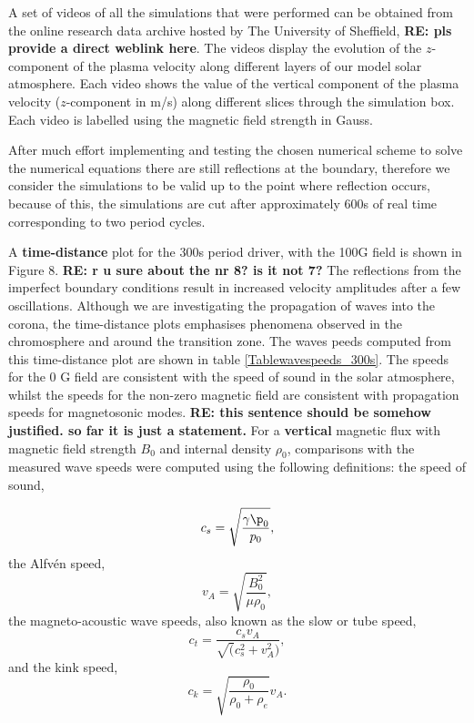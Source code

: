 \documentclass[physics,article,submit,pdftex,moreauthors]{Definitions/mdpi}
\begin{document}
A set of videos of all the simulations that were performed can be obtained from the online research data archive hosted by The University of Sheffield, \citet{Griffiths2018a} {\bf RE: pls provide a direct weblink here}. The videos display the evolution of the $z$-component of the plasma velocity along different layers of our model solar atmosphere. Each video shows the value of the vertical component of the plasma velocity ($z$-component in m/s) along different slices through the simulation box. Each video is labelled using the magnetic field strength in Gauss.









After much  effort implementing and testing  the chosen numerical scheme to solve the numerical equations there are still reflections at the boundary, therefore we consider the simulations to be valid up to the point where reflection occurs, because of this, the simulations are cut after approximately 600s of real time corresponding to two period cycles.

A {\bf time-distance} plot for the 300s period driver, with the 100G field is shown in Figure 8. {\bf RE: r u sure about the nr 8? is it not 7?} The reflections from the imperfect boundary conditions result in increased velocity amplitudes after a few oscillations. Although we are investigating the propagation of waves into the corona, the time-distance plots emphasises phenomena observed in the chromosphere and around the transition zone.  The waves peeds computed from this time-distance plot are shown in table \ref{Tablewavespeeds_300s}. The speeds for the 0 G field are consistent with the speed of sound in the solar atmosphere, whilst the speeds for the non-zero magnetic field are consistent with propagation speeds for magnetosonic modes. {\bf RE: this sentence should be somehow justified. so far it is just a statement.}
For a {\bf vertical} magnetic flux %
with magnetic field strength $B_{0}$ and internal density $\rho_{0}$, comparisons with the measured wave speeds were computed using the following definitions:
the speed of sound,

\begin{equation}
 c_{s}  =    \sqrt{\frac{\gamma\p_0}{p_0}}, 
\label{e10}
\end{equation}
the Alfvén speed,
\begin{equation}
 v_{A}  =    \sqrt{\frac{B_{0}^{2}}{\mu\rho_{0}}},  
\label{e11}
\end{equation}
the magneto-acoustic wave speeds, also known as  the slow or tube speed,
\begin{equation}
 c_{t}  =    \frac{c_s v_A}{\sqrt(c_s^2+v_A^2)}, 
\label{e12}
\end{equation}
and the kink speed,
\begin{equation}
 c_{k}  =    \sqrt{\frac{\rho_0}{\rho_0+\rho_e}}v_A.
\label{e12}
\end{equation}
\end{document}
